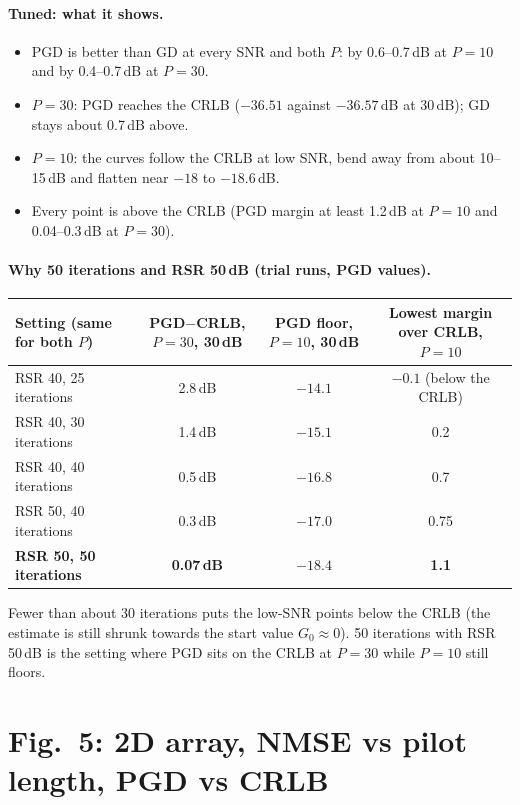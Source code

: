 \documentclass[11pt,a4paper]{article}
\begin{document}
\paragraph{Tuned: what it shows.}
\begin{itemize}[leftmargin=*,itemsep=1pt]
  \item PGD is better than GD at every SNR and both $P$: by 0.6--0.7\,dB at $P=10$ and by
        0.4--0.7\,dB at $P=30$.
  \item $P=30$: PGD reaches the CRLB ($-36.51$ against $-36.57$\,dB at 30\,dB); GD stays about
        0.7\,dB above.
  \item $P=10$: the curves follow the CRLB at low SNR, bend away from about 10--15\,dB and
        flatten near $-18$ to $-18.6$\,dB.
  \item Every point is above the CRLB (PGD margin at least 1.2\,dB at $P=10$ and
        0.04--0.3\,dB at $P=30$).
\end{itemize}

\paragraph{Why 50 iterations and RSR 50\,dB (trial runs, PGD values).}
\begin{center}
\small
\begin{tabular}{lccc}
\toprule
Setting (same for both $P$) & PGD$-$CRLB, $P=30$, 30\,dB & PGD floor, $P=10$, 30\,dB & Lowest margin over CRLB, $P=10$ \\
\midrule
RSR 40, 25 iterations & 2.8\,dB & $-14.1$ & $-0.1$ (below the CRLB) \\
RSR 40, 30 iterations & 1.4\,dB & $-15.1$ & 0.2 \\
RSR 40, 40 iterations & 0.5\,dB & $-16.8$ & 0.7 \\
RSR 50, 40 iterations & 0.3\,dB & $-17.0$ & 0.75 \\
\textbf{RSR 50, 50 iterations} & \textbf{0.07\,dB} & $\mathbf{-18.4}$ & \textbf{1.1} \\
\bottomrule
\end{tabular}
\end{center}
Fewer than about 30 iterations puts the low-SNR points below the CRLB (the estimate is still
shrunk towards the start value $G_0\approx0$). 50 iterations with RSR 50\,dB is the setting where
PGD sits on the CRLB at $P=30$ while $P=10$ still floors.

\section{Fig.~5: 2D array, NMSE vs pilot length, PGD vs CRLB}
\label{sec:fig5}
\end{document}

